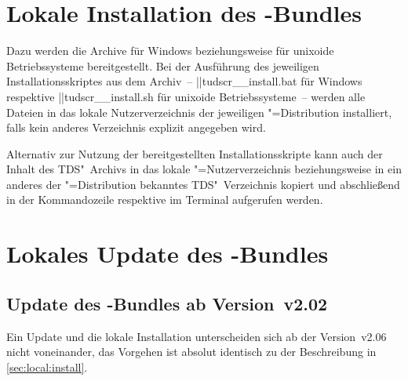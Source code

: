 \section{%
  Lokale Installation des \TUDScript-Bundles%
  \label{sec:local:install}%
}
%

Dazu werden die Archive  
für Windows beziehungsweise  
für unixoide Betriebssysteme bereitgestellt. Bei der Ausführung des jeweiligen 
Installationsskriptes aus dem Archiv~-- \File||{tudscr_\vTUDScript_install.bat}
für Windows respektive \File||{tudscr_\vTUDScript_install.sh} für unixoide 
Betriebssysteme~-- werden alle Dateien in das lokale Nutzerverzeichnis der 
jeweiligen "=Distribution installiert, falls kein anderes 
Verzeichnis explizit angegeben wird. 


Alternativ zur Nutzung der bereitgestellten Installationsskripte kann auch der 
Inhalt des TDS"~Archivs  in das lokale 
"=Nutzerverzeichnis beziehungsweise in ein anderes der 
"=Distribution bekanntes TDS"~Verzeichnis kopiert und 
abschließend in der Kommandozeile respektive im Terminal  
aufgerufen werden. 



\section{%
  Lokales Update des \TUDScript-Bundles%
  \label{sec:local:update}%
}
\subsection{Update des \TUDScript-Bundles ab Version~v2.02}
%
Ein Update und die lokale Installation unterscheiden sich ab der Version~v2.06 
nicht voneinander, das Vorgehen ist absolut identisch zu der Beschreibung in 
\autoref{sec:local:install}.



